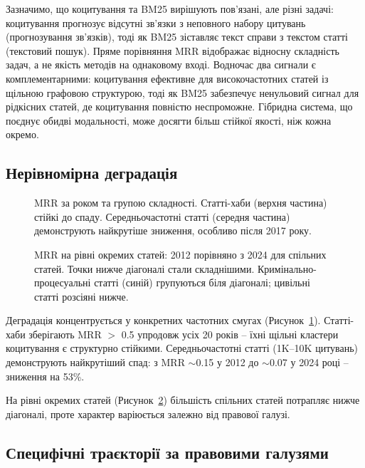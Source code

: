 Зазначимо, що коцитування та BM25 вирішують пов'язані, але різні задачі: коцитування прогнозує відсутні зв'язки з неповного набору цитувань (прогнозування зв'язків), тоді як BM25 зіставляє текст справи з текстом статті (текстовий пошук).
Пряме порівняння MRR відображає відносну складність задач, а не якість методів на однаковому вході.
Водночас два сигнали є комплементарними: коцитування ефективне для високочастотних статей із щільною графовою структурою, тоді як BM25 забезпечує ненульовий сигнал для рідкісних статей, де коцитування повністю неспроможне.
Гібридна система, що поєднує обидві модальності, може досягти більш стійкої якості, ніж кожна окремо.

\subsection{Нерівномірна деградація}

\begin{figure}[t]
\centering

\caption{MRR за роком та групою складності. Статті-хаби (верхня частина) стійкі до спаду. Середньочастотні статті (середня частина) демонструють найкрутіше зниження, особливо після 2017 року.}
\label{fig:heatmap_temporal}
\end{figure}

\begin{figure}[t]
\centering

\caption{MRR на рівні окремих статей: 2012 порівняно з 2024 для спільних статей. Точки нижче діагоналі стали складнішими. Кримінально-процесуальні статті (синій) групуються біля діагоналі; цивільні статті розсіяні нижче.}
\label{fig:stability}
\end{figure}

Деградація концентрується у конкретних частотних смугах (Рисунок~\ref{fig:heatmap_temporal}).
Статті-хаби зберігають MRR $>$ 0.5 упродовж усіх 20 років -- їхні щільні кластери коцитування є структурно стійкими.
Середньочастотні статті (1K--10K цитувань) демонструють найкрутіший спад: з MRR $\sim$0.15 у 2012 до $\sim$0.07 у 2024 році -- зниження на 53\%.

На рівні окремих статей (Рисунок~\ref{fig:stability}) більшість спільних статей потрапляє нижче діагоналі, проте характер варіюється залежно від правової галузі.

\subsection{Специфічні траєкторії за правовими галузями}

